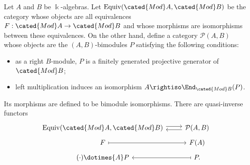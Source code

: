 \begin{theorem}\label{prop:Morita-refined}
	Let $A$ and $B$ be $\Bbbk$-algebras. Let
	$\mathrm{Equiv}(\cated{Mod}A,\cated{Mod}B)$ be the category whose objects
	are all equivalences $F:\cated{Mod}A\to\cated{Mod}B$ and whose morphisms
	are isomorphisms between these equivalences. On the other hand, define a
	category $\mathcal{P}(A,B)$ whose objects are the $(A,B)$-bimodules $P$
	satisfying the following conditions:
	\begin{itemize}
		\item as a right $B$-module, $P$ is a finitely generated projective
		generator of $\cated{Mod}B$;
		\item left multiplication induces an isomorphism
		$A\rightiso\End_{\cated{Mod}B}(P)$.
	\end{itemize}
	Its morphisms are defined to be bimodule isomorphisms. There are
	quasi-inverse functors
	\[
	\begin{tikzcd}[row sep=tiny]
		\mathrm{Equiv}(\cated{Mod}A, \cated{Mod}B) \arrow[shift left, r] & \mathcal{P}(A, B) \arrow[shift left, l] \\
		F \arrow[mapsto, r] & F(A) \\
		(\cdot) \dotimes{A} P & P \arrow[mapsto, l] .
	\end{tikzcd}
	\]
\end{theorem}
